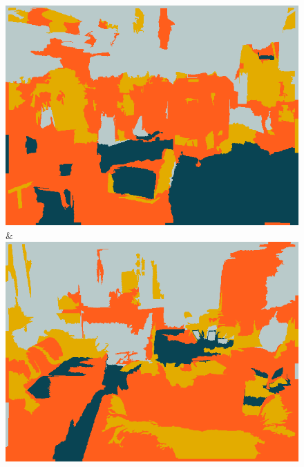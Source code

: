 \documentclass[a4paper, 10pt, conference]{ieeeconf}      %
\begin{document}
\begin{figure}
\begin{tabu}
    \includegraphics[width=\linewidth]{images/00118_svm.png}&%
    \includegraphics[width=\linewidth]{images/01203_svm.png}\\
    \\


\end{tabu}
\end{figure}
\end{document}
